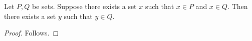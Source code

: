 \begin{proposition}\label{existential_transfer}
    Let $P,Q$ be sets.
    Suppose there exists a set $x$ such that $x\in P$ and $x\in Q$.
    Then there exists a set $y$ such that $y\in Q$.
\end{proposition}
\begin{proof}
    Follows.
\end{proof}
